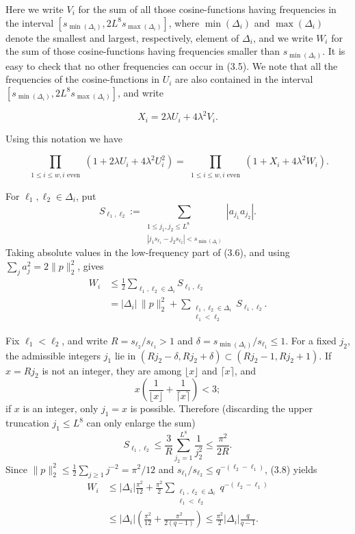 \documentclass[10pt]{article}
\newcommand{\1}{\mathbf{1}}
\begin{document}
Here we write $V_{i}$ for the sum of all those cosine-functions having frequencies in the interval $\left[s_{\min(\Delta_i)},2L^8s_{\max(\Delta_i)}\right]$, where $\min \left(\Delta_{i}\right)$ and $\max \left(\Delta_{i}\right)$ denote the smallest and largest, respectively, element of $\Delta_{i}$, and we write $W_{i}$ for the sum of those cosine-functions having frequencies smaller than $s_{\min(\Delta_i)}$. It is easy to check that no other frequencies can occur in (3.5). We note that all the frequencies of the cosine-functions in $U_{i}$ are also contained in the interval $\left[s_{\min(\Delta_i)},2L^8s_{\max(\Delta_i)}\right]$, and write


\begin{equation*}
X_{i}=2 \lambda U_{i}+4 \lambda^{2} V_{i} . \tag{3.7}
\end{equation*}


Using this notation we have

$$
\prod_{\substack{1 \leqslant i \leqslant w, i \text{ even}}}\left(1+2 \lambda U_{i}+4 \lambda^{2} U_{i}^{2}\right)=\prod_{\substack{1 \leqslant i \leqslant w, i \text{ even}}}\left(1+X_{i}+4 \lambda^{2} W_{i}\right) .
$$

For $\ell_1,\ell_2\in\Delta_i$, put
\[
S_{\ell_1,\ell_2}:=
 \sum_{\substack{1\leqslant j_1,j_2\leqslant L^8\\
 |j_1s_{\ell_1}-j_2s_{\ell_2}|<s_{\min(\Delta_i)}}}
 |a_{j_1}a_{j_2}|.
\]
Taking absolute values in the low-frequency part of (3.6), and using
$\sum_j a_j^2=2\|p\|_2^2$, gives
\begin{align*}
W_i
&\leqslant\frac12\sum_{\ell_1,\ell_2\in\Delta_i}S_{\ell_1,\ell_2}\\
&=|\Delta_i|\,\|p\|_2^2
 +\sum_{\substack{\ell_1,\ell_2\in\Delta_i\\\ell_1<\ell_2}}
  S_{\ell_1,\ell_2}. \tag{3.8}
\end{align*}

Fix $\ell_1<\ell_2$, and write
$R=s_{\ell_2}/s_{\ell_1}>1$ and
$\delta=s_{\min(\Delta_i)}/s_{\ell_1}\leqslant1$.  For a fixed $j_2$, the
admissible integers $j_1$ lie in
$(Rj_2-\delta,Rj_2+\delta)\subset(Rj_2-1,Rj_2+1)$.  If $x=Rj_2$ is not an
integer, they are among $\lfloor x\rfloor$ and $\lceil x\rceil$, and
\[
x\left(\frac1{\lfloor x\rfloor}+\frac1{\lceil x\rceil}\right)<3;
\]
if $x$ is an integer, only $j_1=x$ is possible.  Therefore (discarding the
upper truncation $j_1\leqslant L^8$ can only enlarge the sum)
\[
S_{\ell_1,\ell_2}
 \leqslant\frac3R\sum_{j_2=1}^{L^8}\frac1{j_2^2}
 \leqslant\frac{\pi^2}{2R}.
\]
Since $\|p\|_2^2\leqslant\frac12\sum_{j\geqslant1}j^{-2}=\pi^2/12$ and
$s_{\ell_1}/s_{\ell_2}\leqslant q^{-(\ell_2-\ell_1)}$, (3.8) yields
\begin{align*}
W_i
&\leqslant |\Delta_i|\frac{\pi^2}{12}
 +\frac{\pi^2}{2}
  \sum_{\substack{\ell_1,\ell_2\in\Delta_i\\\ell_1<\ell_2}}
  q^{-(\ell_2-\ell_1)}\\
&\leqslant |\Delta_i|\left(\frac{\pi^2}{12}
 +\frac{\pi^2}{2(q-1)}\right)
 \leqslant\frac{\pi^2}{2}|\Delta_i|\frac{q}{q-1}. \tag{3.9}
\end{align*}
\end{document}
